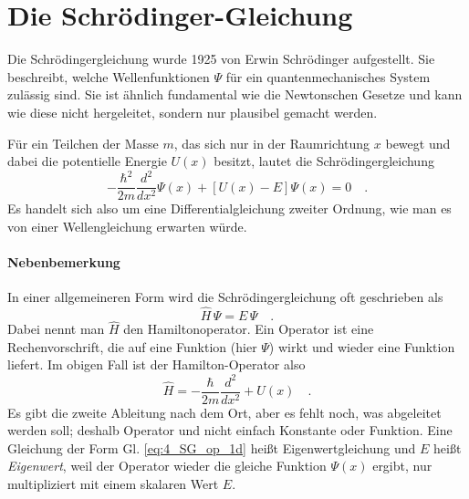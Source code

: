 



\section{Die Schrödinger-Gleichung}

Die Schrödingergleichung wurde 1925 von Erwin Schrödinger aufgestellt. Sie beschreibt, welche Wellenfunktionen $\Psi$ für ein quantenmechanisches System zulässig sind. Sie ist ähnlich fundamental wie die Newtonschen Gesetze und kann wie diese nicht hergeleitet, sondern nur plausibel gemacht werden.

Für ein Teilchen der Masse $m$, das sich nur in der Raumrichtung $x$ bewegt und dabei die potentielle Energie $U(x)$ besitzt, lautet die Schrödingergleichung
\begin{equation}
   - \frac{\hbar^2}{2m} \frac{d^2}{dx^2} \Psi(x) + \left[ U(x) - E \right] \Psi(x) = 0 \quad .
   \label{eq:4_SG_1d}
 \end{equation}
 Es handelt sich also um eine Differentialgleichung zweiter Ordnung, wie man es von einer Wellengleichung erwarten würde.


\paragraph*{Nebenbemerkung} In einer allgemeineren Form wird die Schrödingergleichung oft  geschrieben als
\begin{equation}
    \hat{H} \, \Psi = E \, \Psi \quad .
    \label{eq:4_SG_op_1d}
\end{equation}
Dabei nennt man $\hat{H}$ den Hamiltonoperator. Ein Operator ist eine Rechenvorschrift, die auf eine Funktion (hier $\Psi$) wirkt und wieder eine Funktion liefert. Im obigen Fall ist der Hamilton-Operator also
\begin{equation}
    \hat{H} = - \frac{\hbar}{2m} \frac{d^2}{dx^2} + U(x) \quad .
\end{equation}
Es gibt die zweite Ableitung nach dem Ort, aber es fehlt noch, was abgeleitet werden soll; deshalb Operator und nicht einfach Konstante oder Funktion. 
Eine Gleichung der Form Gl. \ref{eq:4_SG_op_1d} heißt Eigenwertgleichung und $E$ heißt \emph{Eigenwert}, weil der Operator wieder die gleiche Funktion $\Psi(x)$ ergibt, nur multipliziert mit einem skalaren Wert $E$.

